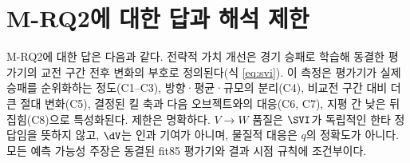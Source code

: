 \section{M-RQ2에 대한 답과 해석 제한}
\label{sec:val-answer}

M-RQ2에 대한 답은 다음과 같다. 전략적 가치 개선은 경기 승패로 학습해 동결한 평가기의 교전 구간 전후 변화의 부호로 정의된다(식 \eqref{eq:svi}). 이 측정은 평가기가 실제 승패를 순위화하는 정도(C1--C3), 방향·평균·규모의 분리(C4), 비교전 구간 대비 더 큰 절대 변화(C5), 결정된 킬 축과 다음 오브젝트와의 대응(C6, C7), 지평 간 낮은 뒤집힘(C8)으로 특성화된다. 제한은 명확하다. $V \to W$ 품질은 $\SVI$가 독립적인 한타 정답임을 뜻하지 않고, $\dV$는 인과 기여가 아니며, 물질적 대응은 $q$의 정확도가 아니다. 모든 예측 가능성 주장은 동결된 fit85 평가기와 결과 시점 규칙에 조건부이다.
